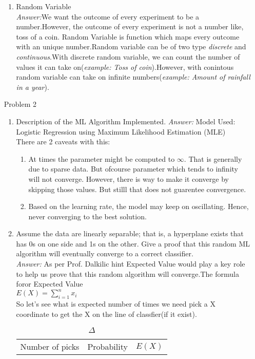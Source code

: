 \documentclass{article}
\begin{document}
\begin{enumerate}
\begin{enumerate}
			\item Random Variable \\	
			\emph{Answer:}We want the outcome of every experiment to be a number.However, the outcome of every experiment is not a number like, toss of a coin. Random Variable is function which maps every outcome with an unique number.Random variable can be of two type \emph{discrete} and \emph{continuous}.With discrete random variable, we can count the number of values it can take on(\emph{example: Toss of coin}).However, with conintous random variable can take on infinite numbers(\emph{example: Amount of rainfall in a year}). 
		\end{enumerate}
	\item[Problem] 2 
		\begin{enumerate}
			\item Description of the ML Algorithm Implemented.
			\emph{Answer:} Model Used: Logistic Regression using Maximum Likelihood Estimation (MLE)\\ There are 2 caveats with this:
			\begin{enumerate}
			\item At  times the parameter might be computed to $\infty$. That is generally due to sparse data. But ofcourse parameter which tends to infinity will not converge. However, there is way to make it converge by skipping those values. But stilll that does not guarentee convergence.
			\item Based on the learning rate, the model may keep on oscillating. Hence, never converging to the best solution.
			\end{enumerate}
			\item Assume the data are linearly separable; that is, a hyperplane exists that has 0s on one side and 1s
			on the other. Give a proof that this random ML algorithm will eventually converge to a correct classifier. \\
			\emph{Answer:} As per Prof. Dalkilic hint Expected Value would play a key role to help us prove that this random algorithm will converge.The formula foror Expected Value \\ $E(X) = \sum_{i=1}^n{x_i}$ \\So let's see what is expected number of times we need pick a X coordinate to get the X on the line of classfier(if it exist).
			\begin{table}[h]
				\caption{$\Delta$} 
				\centering
				\begin{tabular}{cc r}
					\hline
					Number of picks& Probability & $E(X)$ \\

\end{tabular}
\end{table}
\end{enumerate}
\end{enumerate}
\end{document}
